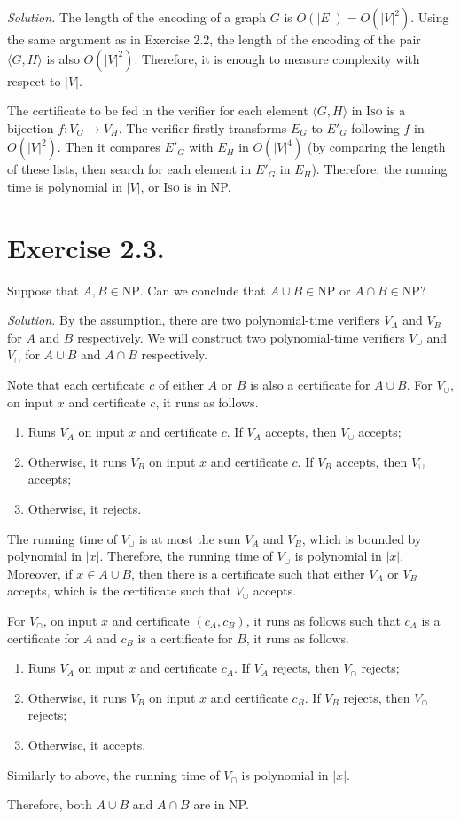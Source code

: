 \textit{Solution.} The length of the encoding of a graph $G$ is $O(|E|) = O(|V|^2)$. Using the same argument as in Exercise 2.2, the length of the encoding of the pair $\langle G, H \rangle$ is also $O(|V|^2)$. Therefore, it is enough to measure complexity with respect to $|V|$.

The certificate to be fed in the verifier for each element $\langle G,H\rangle$ in \textsc{Iso} is a bijection $f: V_G \to V_H$. The verifier firstly transforms $E_G$ to $E'_G$ following $f$ in $O(|V|^2)$. Then it compares $E'_G$ with $E_H$ in $O(|V|^4)$ (by comparing the length of these lists, then search for each element in $E'_G$ in $E_H$). Therefore, the running time is polynomial in $|V|$, or \textsc{Iso} is in NP.

\section{Exercise 2.3.} Suppose that $A,B\in \text{NP}$. Can we conclude that $A\cup B \in \text{NP}$ or $A\cap B \in \text{NP}$?

\textit{Solution.} By the assumption, there are two polynomial-time verifiers $V_A$ and $V_B$ for $A$ and $B$ respectively. We will construct two polynomial-time verifiers $V_\cup$ and $V_\cap$ for $A\cup B$ and $A\cap B$ respectively.

Note that each certificate $c$ of either $A$ or $B$ is also a certificate for $A\cup B$. For $V_\cup$, on input $x$ and certificate $c$, it runs as follows.
\begin{enumerate}
  \item Runs $V_A$ on input $x$ and certificate $c$. If $V_A$ accepts, then $V_\cup$ accepts;
  \item Otherwise, it runs $V_B$ on input $x$ and certificate $c$. If $V_B$ accepts, then $V_\cup$ accepts;
  \item Otherwise, it rejects.
\end{enumerate}

The running time of $V_\cup$ is at most the sum $V_A$ and $V_B$, which is bounded by polynomial in $|x|$. Therefore, the running time of $V_\cup$ is polynomial in $|x|$. Moreover, if $x \in A\cup B$, then there is a certificate such that either $V_A$ or $V_B$ accepts, which is the certificate such that $V_\cup$ accepts.

For $V_\cap$, on input $x$ and certificate $(c_A, c_B)$, it runs as follows such that $c_A$ is a certificate for $A$ and $c_B$ is a certificate for $B$, it runs as follows.

\begin{enumerate}
  \item Runs $V_A$ on input $x$ and certificate $c_A$. If $V_A$ rejects, then $V_\cap$ rejects;
  \item Otherwise, it runs $V_B$ on input $x$ and certificate $c_B$. If $V_B$ rejects, then $V_\cap$ rejects;
  \item Otherwise, it accepts.
\end{enumerate}

Similarly to above, the running time of $V_\cap$ is polynomial in $|x|$.

Therefore, both $A\cup B$ and $A\cap B$ are in NP.